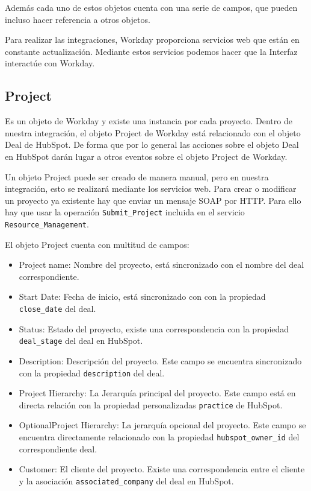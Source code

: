 Además cada uno de estos objetos cuenta con una serie de campos, que pueden incluso hacer referencia a otros objetos.


Para realizar las integraciones, Workday proporciona servicios web que están en constante actualización.
Mediante estos servicios podemos hacer que la Interfaz interactúe con Workday.



\subsection{Project}
Es un objeto de Workday y existe una instancia por cada proyecto. Dentro de nuestra integración, 
el objeto Project de Workday está relacionado con el objeto Deal de HubSpot. 
De forma que por lo general las acciones sobre el objeto Deal en HubSpot darán lugar a otros eventos
 sobre el objeto Project de Workday.
 
Un objeto Project puede ser creado de manera manual, pero en nuestra integración, esto se realizará mediante los servicios web.
Para crear o modificar un proyecto ya existente hay que enviar un mensaje SOAP por HTTP. 
Para ello hay que usar la operación \verb|Submit_Project|  incluida en el servicio \verb|Resource_Management|.

El objeto Project cuenta con multitud de campos: 

\begin{itemize}
\item Project name: Nombre del proyecto, está sincronizado con el nombre del deal correspondiente.
\item Start Date: Fecha de inicio, está sincronizado con con la propiedad \verb|close_date| del deal.
\item Status: Estado del proyecto, existe una correspondencia con la propiedad \verb|deal_stage| del deal en HubSpot.
\item Description: Descripción del proyecto. Este campo se encuentra sincronizado con la propiedad \verb|description| del deal.

\item Project Hierarchy: La Jerarquía principal del proyecto. Este campo está en directa relación con la propiedad personalizadas
\verb|practice| de HubSpot.
\item OptionalProject Hierarchy: La jerarquía opcional del proyecto. Este campo se encuentra directamente relacionado con la propiedad \verb|hubspot_owner_id| del correspondiente deal.
\item Customer: El cliente del proyecto. Existe una correspondencia entre el cliente y la asociación \verb|associated_company| del deal en HubSpot.

\end{itemize}



